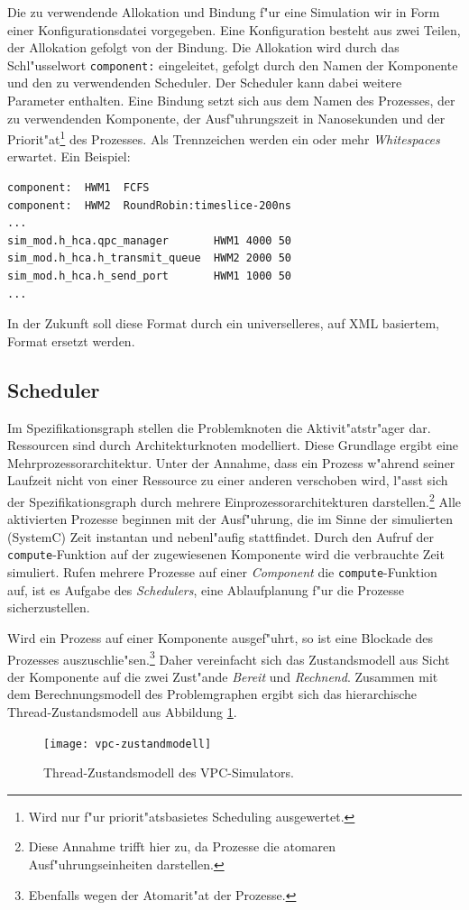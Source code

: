 Die zu verwendende Allokation und Bindung f"ur eine Simulation wir in Form
einer Konfigurationsdatei vorgegeben. Eine Konfiguration besteht aus zwei 
Teilen, der Allokation gefolgt von der Bindung. Die Allokation wird durch 
das Schl"usselwort \verb|component:| eingeleitet, gefolgt durch den Namen 
der Komponente und den zu verwendenden Scheduler. Der Scheduler kann dabei
weitere Parameter enthalten. Eine Bindung setzt sich aus dem Namen des 
Prozesses, der zu verwendenden Komponente, der Ausf"uhrungszeit in Nanosekunden und der 
Priorit"at\footnote{Wird nur f"ur priorit"atsbasietes Scheduling 
ausgewertet.} des Prozesses. Als Trennzeichen werden ein oder 
mehr \emph{Whitespaces} erwartet. Ein Beispiel:\\
\begin{verbatim}
component:  HWM1  FCFS
component:  HWM2  RoundRobin:timeslice-200ns
...
sim_mod.h_hca.qpc_manager       HWM1 4000 50
sim_mod.h_hca.h_transmit_queue  HWM2 2000 50
sim_mod.h_hca.h_send_port       HWM1 1000 50
...
\end{verbatim}
In der Zukunft soll diese Format durch ein 
universelleres, auf XML basiertem, Format ersetzt werden.




\subsection{Scheduler}\label{scheduler}
Im Spezifikationsgraph stellen die Problemknoten die
Aktivit"atstr"ager dar. Ressourcen sind durch
Architekturknoten modelliert. Diese Grundlage ergibt eine
Mehrprozessorarchitektur. Unter der Annahme, dass ein Prozess w"ahrend seiner Laufzeit nicht von einer
Ressource zu einer anderen verschoben wird, l"asst sich der Spezifikationsgraph durch
mehrere Einprozessorarchitekturen darstellen.\footnote{Diese Annahme trifft
  hier zu, da Prozesse die atomaren Ausf"uhrungseinheiten darstellen.} Alle
aktivierten Prozesse beginnen mit der Ausf"uhrung, die im Sinne der 
simulierten (SystemC) Zeit instantan und nebenl"aufig stattfindet. Durch den
Aufruf der \verb|compute|-Funktion auf der zugewiesenen Komponente wird die
verbrauchte Zeit simuliert. Rufen mehrere Prozesse auf einer \emph{Component}
die \verb|compute|-Funktion auf, ist es Aufgabe des \emph{Schedulers}, eine
Ablaufplanung f"ur die Prozesse sicherzustellen.

Wird ein Prozess auf einer Komponente ausgef"uhrt, so ist eine Blockade des
Prozesses auszuschlie"sen.\footnote{Ebenfalls wegen der Atomarit"at der Prozesse.} Daher
 vereinfacht sich das Zustandsmodell aus Sicht
der Komponente auf die zwei Zust"ande \emph{Bereit} und
\emph{Rechnend}. Zusammen mit dem Berechnungsmodell des Problemgraphen ergibt
sich das hierarchische Thread-Zustands\-modell aus Abbildung
\ref{fig:vpc-zustandsmodell}.
\begin{figure}
\begin{center}
\texttt{[image: vpc-zustandmodell]}
\caption{Thread-Zustandsmodell des VPC-Simulators.}
\label{fig:vpc-zustandsmodell}
\end{center}
\end{figure}

